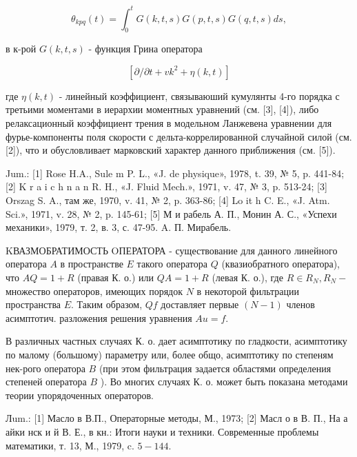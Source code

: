 \documentclass[10pt]{article}
\begin{document}
\[

\theta_{k p q}(t)=\int_{0}^{t} G(k, t, s) G(p, t, s) G(q, t, s) d s,

\]



в к-рой $G(k, t, s)$ - функция Грина оператора



\[

\left[\partial / \partial t+v k^{2}+\eta(k, t)\right]

\]



где $\eta(k, t)$ - линейный коэффициент, связываюший кумулянты 4-го порядка с третьими моментами в иерархии моментных уравнений (см. [3], [4]), либо релаксационный коэффициент трения в модельном Ланжевена уравнении для фурье-компоненты поля скорости с дельта-коррелированной случайной силой (см. [2]), что и обусловливает марковский характер данного приближения (см. [5]).



Jum.: [1] Rose H.A., Sule m P. L., «J. de physique», 1978, t. 39, № 5, p. 441-84; [2] K r a i c h n a n R. H., «J. Fluid Mech.», 1971, v. 47, № 3, p. 513-24; [3] Orszag S. A., там же, 1970, v. 41, № 2, p. 363-86; [4] Lo it h C. E., «J. Atm. Sci.», 1971, v. 28, № 2, p. 145-61; [5] М и рабель А. П., Монин А. С., «Успехи механики», 1979, т. 2, в. 3, с. 47-95. A. П. Мирабель.



KВАЗМОБРАТИМОСТЬ OПЕРАТОРА - существование для данного линейного оператора $A$ в пространстве $E$ такого оператора $Q$ (квазиобратного оператора), что $A Q=1+R$ (правая К. о.) или $Q A=1+R$ (левая К. о.), где $R \in R_{N}, R_{N}-$ множество операторов, имеющих порядок $N$ в некоторой фильтрации пространства $E$. Таким образом, $Q f$ доставляет первые $(N-1)$ членов асимптотич. разложения решения уравнения $A u=f$.



В различных частных случаях К. о. дает асимптотику по гладкости, асимптотику по малому (большому) параметру или, более общо, асимптотику по степеням нек-рого оператора $B$ (при этом фильтрация задается областями определения степеней оператора $B$ ). Во многих случаях К. о. может быть показана методами теории упорядоченных операторов.



Лum.: [1] Масло в В.П., Операторные методы, М., 1973; [2] Масл о в В. П., На а айки нск и й В. Е., в кн.: Итоги науки и техники. Современные проблемы математики, т. 13, М., 1979, c. $5-144$.
\end{document}
